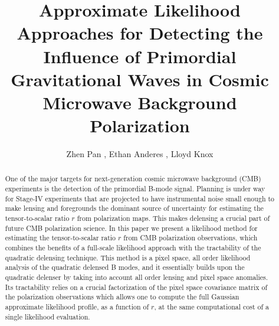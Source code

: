 \documentclass[iop,apj, numberedappendix]{emulateapj}
\begin{document}
\title{Approximate Likelihood Approaches for Detecting the Influence of Primordial
Gravitational Waves in Cosmic Microwave Background Polarization}


\author{Zhen Pan ,
        Ethan Anderes ,
        Lloyd Knox }



\begin{abstract}
One of the major targets for next-generation cosmic microwave background (CMB)
experiments is the detection of the primordial B-mode signal. Planning is under
way for Stage-IV experiments that are projected to have instrumental noise small
enough to make lensing and foregrounds the dominant source of uncertainty for estimating
the tensor-to-scalar ratio $r$ from polarization maps.
This makes delensing a crucial part of future CMB polarization science.
In this paper we  present a likelihood method for estimating the
tensor-to-scalar ratio $r$ from CMB polarization observations, which
combines the benefits of a full-scale likelihood approach with the tractability
of the quadratic delensing technique.
This method is a pixel space, all order likelihood analysis of the quadratic delensed B modes,
and it essentially builds upon the quadratic
delenser by taking into account all order lensing and pixel space anomalies.
Its tractability relies on a crucial factorization of the pixel space covariance matrix of the
polarization observations which allows one to compute the full Gaussian approximate likelihood profile,
as a function of $r$, at the same computational cost of a single likelihood evaluation.
\end{abstract}


\bigskip\bigskip
\end{document}
